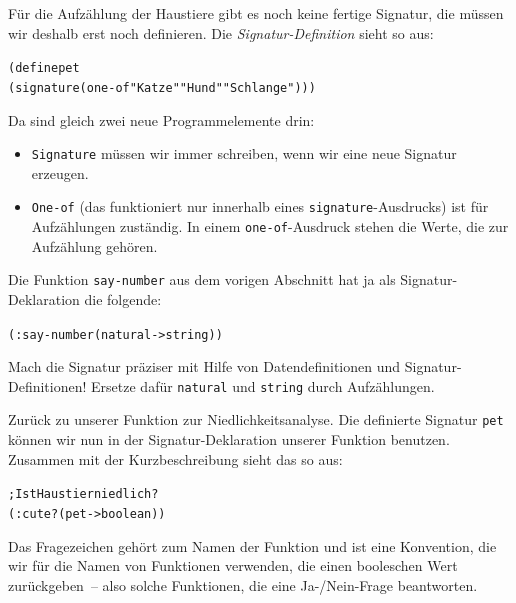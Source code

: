 Für die Aufzählung der Haustiere gibt es noch keine fertige Signatur,
die müssen wir deshalb erst noch definieren.  Die
\textit{Signatur-Definition} sieht so
aus:
\label{sec:pet}\label{page:signature}
%
\begin{alltt}
(define pet
  (signature (one-of "Katze" "Hund" "Schlange")))
\end{alltt}
%
Da sind gleich zwei neue Programmelemente drin:
%
\begin{itemize}
\item \texttt{Signature} müssen wir immer schreiben, wenn wir eine
  neue Signatur erzeugen.
\item \texttt{One-of} (das funktioniert
  nur innerhalb eines \texttt{signature}-Ausdrucks) ist für
  Aufzählungen zuständig.  In einem \texttt{one-of}-Ausdruck stehen
  die Werte, die zur Aufzählung gehören.
\end{itemize}
%
\begin{aufgabe}
  Die Funktion \texttt{say-number} aus dem vorigen Abschnitt hat ja als
  Signatur-Deklaration die folgende:
\begin{alltt}
(: say-number (natural -> string))
\end{alltt}
  Mach die Signatur präziser mit Hilfe von Datendefinitionen und
  Signatur-Definitionen!  Ersetze dafür \texttt{natural} und
  \texttt{string} durch Aufzählungen.
\end{aufgabe}
%
Zurück zu unserer Funktion zur Niedlichkeitsanalyse.  Die definierte
Signatur \texttt{pet} können wir nun in der Signatur-Deklaration
unserer Funktion benutzen.  Zusammen mit der Kurzbeschreibung sieht
das so aus:
%
\begin{alltt}
; Ist Haustier niedlich?
(: cute? (pet -> boolean))
\end{alltt}
%
Das Fragezeichen gehört zum Namen der Funktion und ist eine
Konvention, die wir für die Namen von Funktionen verwenden, die einen
booleschen Wert zurückgeben~-- also solche Funktionen, die eine
Ja-/Nein-Frage beantworten.

